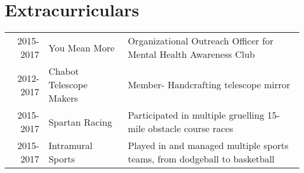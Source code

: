 \documentclass[]{deedy-resume-openfont}
\begin{document}
\begin{minipage}[t]{0.33\textwidth}
\section{Extracurriculars} 


\small{
\begin{tabular}{rll}
2015-2017 	& You Mean More  & Organizational Outreach Officer for Mental Health Awareness Club \\
2012-2017   & Chabot Telescope Makers 
 & Member- Handcrafting telescope mirror\\
2015-2017   &  Spartan Racing & Participated in multiple gruelling 15-mile obstacle course races \\
2015-2017   &  Intramural Sports & Played in and managed multiple sports teams, from dodgeball to basketball\\
\end{tabular}}
\sectionsep



\end{minipage}
\end{document}
